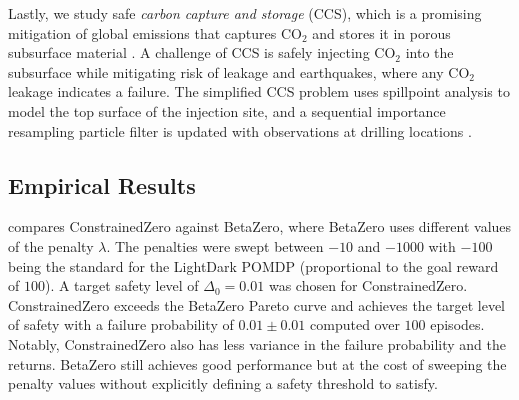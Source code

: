 Lastly, we study safe \textit{carbon capture and storage} (CCS), which is a promising mitigation of global emissions that captures CO$_2$ and stores it in porous subsurface material \cite{corso2022pomdp}.
A challenge of CCS is safely injecting CO$_2$ into the subsurface while mitigating risk of leakage and earthquakes, where any CO$_2$ leakage indicates a failure.
The simplified CCS problem uses spillpoint analysis to model the top surface of the injection site, and a sequential importance resampling particle filter is updated with observations at drilling locations \cite{corso2022pomdp}.


\subsection{Empirical Results}
 compares ConstrainedZero against BetaZero, where BetaZero uses different values of the penalty $\lambda$.
The penalties were swept between $-10$ and $-1000$ with $-100$ being the standard for the LightDark POMDP (proportional to the goal reward of $100$).
A target safety level of ${\Delta_0 = 0.01}$ was chosen for ConstrainedZero.
ConstrainedZero exceeds the BetaZero Pareto curve and achieves the target level of safety with a failure probability of ${0.01 \pm 0.01}$ computed over $100$ episodes.
Notably, ConstrainedZero also has less variance in the failure probability and the returns.
BetaZero still achieves good performance but at the cost of sweeping the penalty values without explicitly defining a safety threshold to satisfy.


